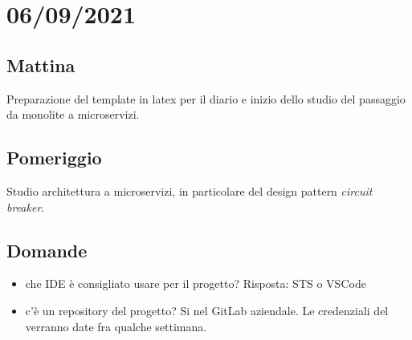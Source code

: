 \section{06/09/2021}
\subsection{Mattina}
Preparazione del template in latex per il diario e inizio dello studio del passaggio da monolite a microservizi.
\subsection{Pomeriggio}
Studio architettura a microservizi, in particolare del design pattern \textit{circuit breaker}.
\subsection{Domande}
\begin{itemize}
    \item che IDE è consigliato usare per il progetto? Risposta: STS o VSCode
    \item c'è un repository del progetto? Si nel GitLab aziendale. Le credenziali del  verranno date fra qualche settimana.
\end{itemize} 

